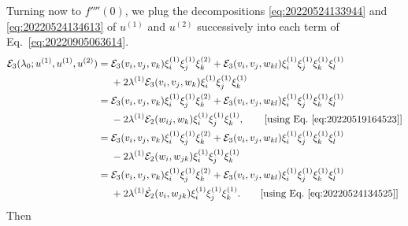 \documentclass[12pt, final]{scrartcl}
\theoremstyle{definition}
\newcommand{\E}{\mathcal E}
\newcommand{\order}[2][1]{#2^{(#1)}}
\begin{document}
Turning now to $f''''(0)$, we plug the decompositions
\eqref{eq:20220524133944} and \eqref{eq:20220524134613} of $\order[1]u$ and
$\order[2]u$ successively into each term of Eq.~\eqref{eq:20220905063614}.
\begin{equation*}
  \begin{aligned}[b]
    \E_3(\lambda_0; \order[1]u, \order[1]u, \order[2]u)
    ={} & \E_3(v_i, v_j, v_k) \order[1]{\xi_i} \order[1]{\xi_j} \order[2]{\xi_k} + \E_3(v_i, v_j, w_{k l}) \order[1]{\xi_i} \order[1]{\xi_j} \order[1]{\xi_k} \order[1]{\xi_l}\\
    & + 2\order[1]\lambda \E_3(v_i, v_j, w_k) \order[1]{\xi_i} \order[1]{\xi_j} \order[1]{\xi_k} \\
    ={} & \E_3(v_i, v_j, v_k) \order[1]{\xi_i} \order[1]{\xi_j} \order[2]{\xi_k} + \E_3(v_i, v_j, w_{k l}) \order[1]{\xi_i} \order[1]{\xi_j} \order[1]{\xi_k} \order[1]{\xi_l}\\
    & - 2\order[1]\lambda \E_2(w_{ij}, w_k) \order[1]{\xi_i} \order[1]{\xi_j} \order[1]{\xi_k}, \qquad \text{[using Eq.~\eqref{eq:20220519164523}]}\\
    ={} & \E_3(v_i, v_j, v_k) \order[1]{\xi_i} \order[1]{\xi_j} \order[2]{\xi_k} + \E_3(v_i, v_j, w_{kl}) \order[1]{\xi_i} \order[1]{\xi_j} \order[1]{\xi_k} \order[1]{\xi_l}\\
    & - 2\order[1]\lambda \E_2(w_{i}, w_{jk}) \order[1]{\xi_i} \order[1]{\xi_j} \order[1]{\xi_k}\\
    ={} & \E_3(v_i, v_j, v_k) \order[1]{\xi_i} \order[1]{\xi_j} \order[2]{\xi_k} + \E_3(v_i, v_j, w_{kl}) \order[1]{\xi_i} \order[1]{\xi_j} \order[1]{\xi_k} \order[1]{\xi_l}\\
    & + 2 \order[1]\lambda \dot{\E}_2(v_{i}, w_{jk}) \order[1]{\xi_i} \order[1]{\xi_j} \order[1]{\xi_k}. \qquad \text{[using Eq.~\eqref{eq:20220524134525}]}
  \end{aligned}
\end{equation*}
Then
\end{document}
